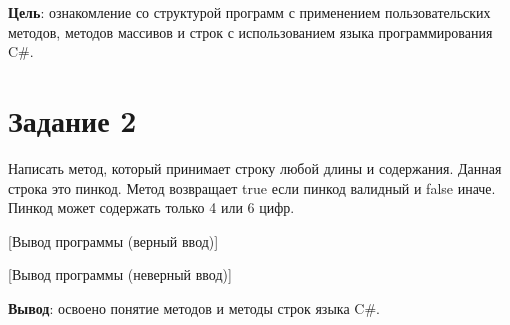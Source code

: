 \documentclass{bsuir}
\newcommand{\csharp}{C{\liberationrm\#}}
\begin{document}

\textbf{Цель}: ознакомление со структурой программ с применением
пользовательских методов, методов массивов и строк с использованием языка
программирования \csharp.

\section*{Задание 2}

Написать метод, который принимает строку любой длины и содержания. Данная строка
это пинкод. Метод возвращает true если пинкод валидный и false иначе. Пинкод
может содержать только 4 или 6 цифр.


[Вывод программы (верный ввод)]

[Вывод программы (неверный ввод)]

\textbf{Вывод}: освоено понятие методов и методы строк языка \csharp.
\end{document}
